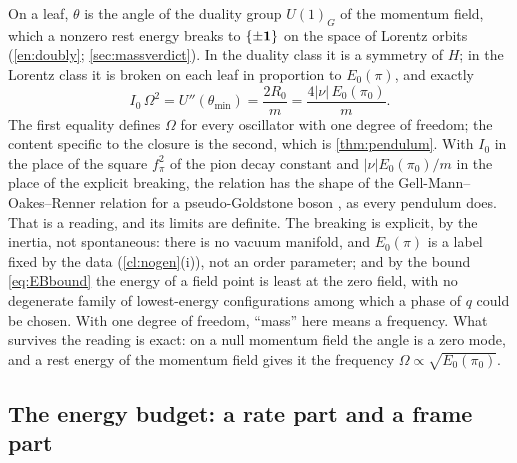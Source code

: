 \begin{remark}
\label{cl:goldstone}
On a leaf, $\theta$ is the angle of the duality group $U(1)_G$ of the momentum field, which a nonzero rest energy breaks to $\{\pm\mathbf 1\}$ on the
space of Lorentz orbits (\cref{en:doubly}; \cref{sec:massverdict}). In the duality class it is a symmetry of $H$; in the Lorentz class it is broken on each leaf in proportion to
$E_0(\pi)$, and exactly
\[
I_0\,\Omega^2=U''(\theta_{\min})=\frac{2R_0}m=\frac{4|\nu|\,E_0(\pi_0)}m .
\]
The first equality defines $\Omega$ for every oscillator with one degree of freedom; the content specific to the closure is the second, which is
\cref{thm:pendulum}. With $I_0$ in the place of the square $f_\pi^2$ of the pion decay constant and $|\nu|E_0(\pi_0)/m$ in the place of the explicit breaking, the relation has the
shape of the Gell-Mann--Oakes--Renner relation for a pseudo-Goldstone boson \cite{GellMannOakesRenner68,Weinberg72}, as every pendulum does.
That is a reading, and its limits are definite. The breaking is explicit, by the inertia, not spontaneous: there is no vacuum manifold, and
$E_0(\pi)$ is a label fixed by the data (\cref{cl:nogen}(i)), not an order parameter; and by the bound \eqref{eq:EBbound} the energy of a field point
is least at the zero field, with no degenerate family of lowest-energy configurations among which a phase of $q$ could be chosen. With one degree of freedom, ``mass'' here means a frequency. What survives the reading is exact: on a null
momentum field the angle is a zero mode, and a rest energy of the momentum field gives it the frequency $\Omega\propto\sqrt{E_0(\pi_0)}$.
\end{remark}

\subsection{The energy budget: a rate part and a frame part}
\label{sec:restbudget}

